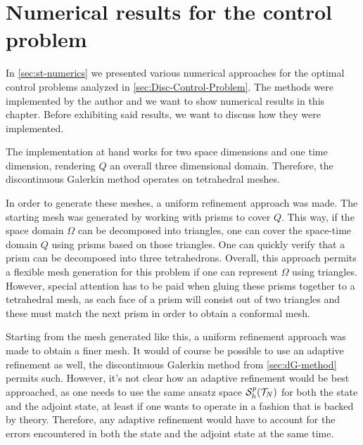 \documentclass[../thesis.tex]{subfiles}
\begin{document}
\chapter{Numerical results for the control problem}
In \cref{sec:st-numerics} we presented various numerical approaches for the optimal control problems analyzed in \cref{sec:Disc-Control-Problem}.
The methods were implemented by the author and we want to show numerical results in this chapter.
Before exhibiting said results, we want to discuss how they were implemented.

The implementation at hand works for two space dimensions and one time dimension, rendering $Q$ an overall three dimensional domain.
Therefore, the discontinuous Galerkin method operates on tetrahedral meshes.

In order to generate these meshes, a uniform refinement approach was made. The starting mesh was generated by working with prisms to cover $Q$. This way, if the space domain $\Omega$ can be decomposed into triangles, one can cover the space-time domain $Q$ using prisms based on those triangles.
One can quickly verify that a prism can be decomposed into three tetrahedrons. Overall, this approach permits a flexible mesh generation for this problem if one can represent $\Omega$ using triangles.
However, special attention has to be paid when gluing these prisms together to a tetrahedral mesh, as each face of a prism will consist out of two triangles and these must match the next prism in order to obtain a conformal mesh.

Starting from the mesh generated like this, a uniform refinement approach was made to obtain a finer mesh. It would of course be possible to use an adaptive refinement as well, the discontinuous Galerkin method from \cref{sec:dG-method} permits such.
However, it's not clear how an adaptive refinement would be best approached, as one needs to use the same ansatz space $\mathcal{S}_h^p(\mathcal{T}_N)$ for both the state and the adjoint state, at least if one wants to operate in a fashion that is backed by theory. Therefore, any adaptive refinement would have to account for the errors encountered in both the state and the adjoint state at the same time.
\end{document}
